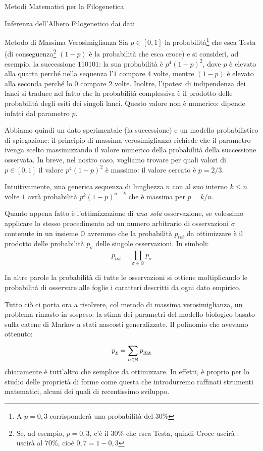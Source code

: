 \documentclass{article}
\begin{document}
\begin{section}{Metodi Matematici per la Filogenetica}
\begin{subsection}{Inferenza dell’Albero Filogenetico dai dati}
\begin{subsubsection}{Metodo di Massima Verosimiglianza}
				Sia $p\in [0,1]$ la probabilità\footnote{A $p=0,3$ corrisponderà una probabilità del $30\%$} che esca Testa (di conseguenza\footnote{Se, ad esempio, $p=0,3$, c'è il $30\%$ che esca Testa, quindi Croce uscirà : uscirà al $70\%$, cioè $0,7=1-0,3$} $(1-p)$ è la probabilità che esca croce) e si considerì, ad esempio, la successione $110101$: la sua probabilità è $p^4(1-p)^2$, dove $p$ è elevato alla quarta perché nella sequenza l'$1$ compare $4$ volte, mentre $(1-p)$ è elevato alla seconda perché lo $0$ compare $2$ volte. Inoltre, l’ipotesi di indipendenza dei lanci si traduce nel fatto che la probabilità complessiva è il prodotto delle probabilità degli esiti dei singoli lanci. 
				Questo valore non è numerico: dipende infatti dal parametro $p$.
				 
				Abbiamo quindi un dato sperimentale (la successione) e un modello probabilistico di spiegazione: il principio di massima verosimiglianza richiede che il parametro ivenga scelto massimizzando il valore numerico della probabilità della successione osservata. In breve, nel nostro caso, vogliamo trovare per quali valori di $p\in [0,1]$ il valore $p^4(1-p)^2$ è massimo: il valore cercato è $p=2/3$.

				Intuitivamente, una generica sequenza di lunghezza $n$ con al suo interno $k\leq n$ volte $1$ avrà probabilità $p^k(1-p)^{n-k}$ che è massima per $p=k/n$.
				
				Quanto appena fatto è l’ottimizzazione di \emph{una sola} osservazione, se volessimo applicare lo stesso procedimento ad un numero arbitrario di osservazioni $\sigma$ contenute in un insieme $\mathbb{O}$ avremmo che la probabilità $p_{tot}$ da ottimizzare è il prodotto delle probabilità $p_{\sigma}$ delle singole osservazioni. In simboli: $$ p_{tot} = \prod_{\sigma \in \mathbb{O}}^{} p_{\sigma} $$
				
				In altre parole la probabilità di tutte le osservazioni si ottiene moltiplicando le probabilità di osservare alle foglie i caratteri descritti da ogni dato empirico.
				
				Tutto ciò ci porta ora a risolvere, col metodo di massima verosimiglianza, un problema rimasto in sospeso: la stima dei parametri del modello biologico basato sulla catene di Markov a stati nascosti generalizzate. Il polinomio che avevamo ottenuto: $$ p_{\underline{s}} = \sum_{n\in\aleph}^{}p_{\underline{ms}} $$
				chiaramente è tutt’altro che semplice da ottimizzare. In effetti, è proprio per lo studio delle proprietà di forme come questa che introdurremo raffinati strumenti matematici, alcuni dei quali di recentissimo sviluppo.
			\end{subsubsection}
		

\end{subsection}
\end{section}
\end{document}
